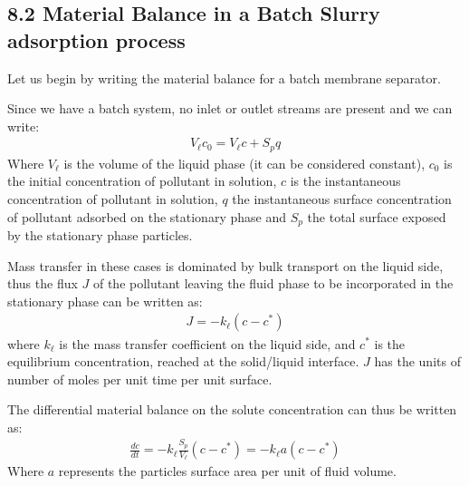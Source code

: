 \documentclass[letterpaper,10pt,english]{jupyterBook}
\begin{document}
\subsection{8.2 Material Balance in a Batch Slurry adsorption process}
\label{\detokenize{Slurry_Adsorption:material-balance-in-a-batch-slurry-adsorption-process}}
\sphinxAtStartPar
Let us begin by writing the material balance for a batch membrane separator.

\sphinxAtStartPar
Since we have a batch system, no inlet or outlet streams are present and we can write:
\begin{equation}\label{equation:Slurry_Adsorption:slurryeq1}
\begin{split}
V_\ell{c_0}=V_\ell{c}+S_pq
\end{split}
\end{equation}
\sphinxAtStartPar
Where \(V_{\ell}\) is the volume of the liquid phase (it can be considered constant), \(c_0\) is the initial concentration of pollutant in solution, \(c\) is the instantaneous concentration of pollutant in solution,  \(q\) the instantaneous surface concentration of pollutant adsorbed on the stationary phase and \(S_p\) the total surface exposed by the stationary phase particles.

\sphinxAtStartPar
Mass transfer in these cases is dominated by bulk transport on the liquid side, thus the flux \(J\) of the pollutant leaving the fluid phase to be incorporated in the stationary phase can be written as:
\begin{equation}\label{equation:Slurry_Adsorption:slurryeq2}
\begin{split}
J=-k_\ell(c-c^*)
\end{split}
\end{equation}
\sphinxAtStartPar
where \(k_\ell\) is the mass transfer coefficient on the liquid side, and \(c^*\) is the equilibrium concentration, reached at the solid/liquid interface. \(J\) has the units of number of moles per unit time per unit surface.

\sphinxAtStartPar
The differential material balance on the solute concentration can thus be written as:
\begin{equation}\label{equation:Slurry_Adsorption:slurryeq3}
\begin{split}
\frac{dc}{dt}=-k_\ell\frac{S_p}{V_\ell}(c-c^*)=-k_\ell{a}(c-c^*)
\end{split}
\end{equation}
\sphinxAtStartPar
Where \(a\) represents the particles surface area per unit of fluid volume.
\end{document}

